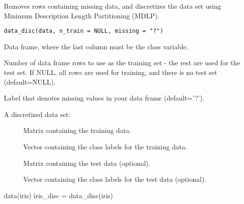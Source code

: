 \documentclass[a4paper]{book}
\begin{document}
%
\begin{Description}\relax
Removes rows containing missing data, and discretizes the data set using Minimum Description Length Partitioning (MDLP).
\end{Description}
%
\begin{Usage}
\begin{verbatim}
data_disc(data, n_train = NULL, missing = "?")
\end{verbatim}
\end{Usage}
%
\begin{Arguments}
\begin{ldescription}
\item[\code{data}] Data frame, where the last column must be the class variable.

\item[\code{n\_train}] Number of data frame rows to use as the training set - the rest are used for the test set. If NULL, all rows are used for training, and there is no test set (default=NULL).

\item[\code{missing}] Label that denotes missing values in your data frame (default='?').
\end{ldescription}
\end{Arguments}
%
\begin{Value}
A discretized data set:
\begin{description}
     
\item[] Matrix containing the training data.
\item[] Vector containing the class labels for the training data.
\item[] Matrix containing the test data (optional).
\item[] Vector containing the class labels for the test data (optional).

\end{description}

\end{Value}
%
\begin{Examples}
\begin{ExampleCode}
data(iris)
iris_disc = data_disc(iris)
\end{ExampleCode}
\end{Examples}
\end{document}
